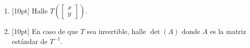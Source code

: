 \documentclass[11pt]{article}
\begin{document}
\begin{enumerate}
\begin{enumerate}
\vspace{4cm}

\item{}[10pt] Halle $T\left(\begin{bmatrix}x\\y\end{bmatrix}\right)$.

\vspace{5cm}

\item{}[10pt] En caso de que $T$ sea invertible, halle $\det(A)$ donde $A$ es la matriz estándar de $T^{-1}$.

\vspace{5cm}
\end{enumerate}
\end{enumerate}

\examfooter
\end{document}
